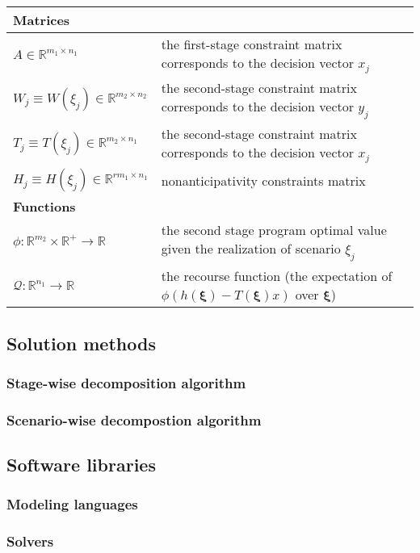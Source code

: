 \begin{table}[H]
{\begin{tabular}{ll}
			\textbf{Matrices} &  \\  \midrule
			$A\in\mathbb{R}^{m_1\times n_1}$	&	the first-stage constraint matrix corresponds to the decision vector $x_j$\\
			$W_j\equiv W(\xi_j)\in\mathbb{R}^{m_2\times n_2}$	&	the second-stage constraint matrix corresponds to the decision vector $y_j$\\
			$T_j\equiv T(\xi_j)\in\mathbb{R}^{m_2\times n_1}$	&	the second-stage constraint matrix corresponds to the decision vector $x_j$\\
			$H_j\equiv H(\xi_j)\in\mathbb{R}^{rm_1\times n_1}$	&	nonanticipativity constraints matrix \\ \midrule
			\textbf{Functions}	&	\\ \midrule
			$\phi:\mathbb{R}^{m_2}\times\mathbb{R}^{+}\to\mathbb{R}$	&	the second stage program optimal value given the realization of scenario $\xi_j$	\\
			$\mathcal{Q}:\mathbb{R}^{n_1}\to\mathbb{R}$	&	the recourse function (the expectation of $\phi\left( h(\pmb{\xi})-T(\pmb{\xi})x \right)$ over $\pmb{\xi}$) 	\\
			\hline
		\end{tabular}
	}
\end{table} 


\subsection{Solution methods}
\subsubsection{Stage-wise decomposition algorithm}
\subsubsection{Scenario-wise decompostion algorithm}

\subsection{Software libraries}
\subsubsection{Modeling languages}
\subsubsection{Solvers}


